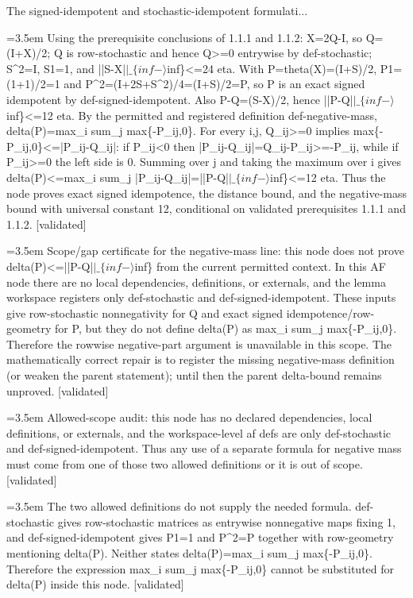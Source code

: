 \documentclass{article}
\newcommand{\step}[1]{\par\noindent\hangindent=3.5em\hangafter=1%
  \makebox[3.5em][l]{\textbf{#1.}}}
\newcommand{\steptag}[1]{\hfill{\small\textsf{[#1]}}}
\begin{document}
\begin{proofbox}{The signed-idempotent and stochastic-idempotent formulati...}
\step{1.1.3.7} Using the prerequisite conclusions of 1.1.1 and 1.1.2: X=2Q-I, so Q=(I+X)/2; Q is row-stochastic and hence Q>=0 entrywise by def-stochastic; S\textasciicircum{}2=I, S1=1, and ||S-X|$|\_\{inf-\rangle$inf\}<=24 eta. With P=theta(X)=(I+S)/2, P1=(1+1)/2=1 and P\textasciicircum{}2=(I+2S+S\textasciicircum{}2)/4=(I+S)/2=P, so P is an exact signed idempotent by def-signed-idempotent. Also P-Q=(S-X)/2, hence ||P-Q|$|\_\{inf-\rangle$inf\}<=12 eta. By the permitted and registered definition def-negative-mass, delta(P)=max\_i sum\_j max\{-P\_ij,0\}. For every i,j, Q\_ij>=0 implies max\{-P\_ij,0\}<=|P\_ij-Q\_ij|: if P\_ij<0 then |P\_ij-Q\_ij|=Q\_ij-P\_ij>=-P\_ij, while if P\_ij>=0 the left side is 0. Summing over j and taking the maximum over i gives delta(P)<=max\_i sum\_j |P\_ij-Q\_ij|=||P-Q|$|\_\{inf-\rangle$inf\}<=12 eta. Thus the node proves exact signed idempotence, the distance bound, and the negative-mass bound with universal constant 12, conditional on validated prerequisites 1.1.1 and 1.1.2. \steptag{validated} \\[6pt]
\step{1.1.3.7.1} Scope/gap certificate for the negative-mass line: this node does not prove delta(P)<=||P-Q|$|\_\{inf-\rangle$inf\} from the current permitted context. In this AF node there are no local dependencies, definitions, or externals, and the lemma workspace registers only def-stochastic and def-signed-idempotent. These inputs give row-stochastic nonnegativity for Q and exact signed idempotence/row-geometry for P, but they do not define delta(P) as max\_i sum\_j max\{-P\_ij,0\}. Therefore the rowwise negative-part argument is unavailable in this scope. The mathematically correct repair is to register the missing negative-mass definition (or weaken the parent statement); until then the parent delta-bound remains unproved. \steptag{validated} \\[6pt]
\step{1.1.3.7.1.1} Allowed-scope audit: this node has no declared dependencies, local definitions, or externals, and the workspace-level af defs are only def-stochastic and def-signed-idempotent. Thus any use of a separate formula for negative mass must come from one of those two allowed definitions or it is out of scope. \steptag{validated} \\[4pt]
\step{1.1.3.7.1.2} The two allowed definitions do not supply the needed formula. def-stochastic gives row-stochastic matrices as entrywise nonnegative maps fixing 1, and def-signed-idempotent gives P1=1 and P\textasciicircum{}2=P together with row-geometry mentioning delta(P). Neither states delta(P)=max\_i sum\_j max\{-P\_ij,0\}. Therefore the expression max\_i sum\_j max\{-P\_ij,0\} cannot be substituted for delta(P) inside this node. \steptag{validated} \\[4pt]

\end{proofbox}
\end{document}
